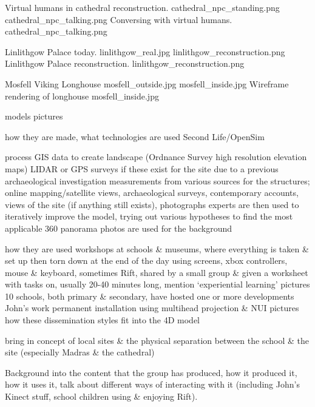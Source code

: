  {Virtual humans in cathedral reconstruction.} {cathedral_npc_standing.png}
       {cathedral_npc_talking.png} {Conversing with virtual humans.} {cathedral_npc_talking.png}



 {Linlithgow Palace today.} {linlithgow_real.jpg}
       {linlithgow_reconstruction.png} {Linlithgow Palace reconstruction.} {linlithgow_reconstruction.png}

 {Mosfell Viking Longhouse} {mosfell_outside.jpg}
	   {mosfell_inside.jpg} {Wireframe rendering of longhouse} {mosfell_inside.jpg}



models
	pictures



how they are made, what technologies are used
	Second Life/OpenSim
	
process
	GIS data to create landscape (Ordnance Survey high resolution elevation maps)
	LIDAR or GPS surveys if these exist for the site due to a previous archaeological investigation
	measurements from various sources for the structures; online mapping/satellite views, archaeological surveys, contemporary accounts, views of the site (if anything still exists), photographs
	experts are then used to iteratively improve the model, trying out various hypotheses to find the most applicable
	360 panorama photos are used for the background
	
	
	
how they are used
	workshops at schools \& museums, where everything is taken \& set up then torn down at the end of the day
		using screens, xbox controllers, mouse \& keyboard, sometimes Rift, shared by a small group \& given a worksheet with tasks on, usually 20-40 minutes long, mention `experiential learning'
		pictures
		10 schools, both primary \& secondary, have hosted one or more developments
	John's work
		permanent installation
		using multihead projection \& NUI
		pictures
how these dissemination styles fit into the 4D model

bring in concept of local sites \& the physical separation between the school \& the site (especially Madras \& the cathedral)


Background into the content that the group has produced, how it produced it, how it uses it, talk about different ways of interacting with it (including John's Kinect stuff, school children using \& enjoying Rift).

